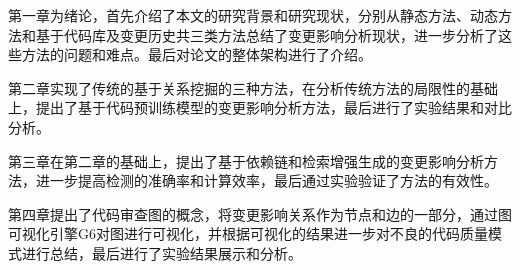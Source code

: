 第一章为绪论，首先介绍了本文的研究背景和研究现状，分别从静态方法、动态方法和基于代码库及变更历史共三类方法总结了变更影响分析现状，进一步分析了这些方法的问题和难点。最后对论文的整体架构进行了介绍。


第二章实现了传统的基于关系挖掘的三种方法，在分析传统方法的局限性的基础上，提出了基于代码预训练模型的变更影响分析方法，最后进行了实验结果和对比分析。

第三章在第二章的基础上，提出了基于依赖链和检索增强生成的变更影响分析方法，进一步提高检测的准确率和计算效率，最后通过实验验证了方法的有效性。

第四章提出了代码审查图的概念，将变更影响关系作为节点和边的一部分，通过图可视化引擎G6对图进行可视化，并根据可视化的结果进一步对不良的代码质量模式进行总结，最后进行了实验结果展示和分析。



